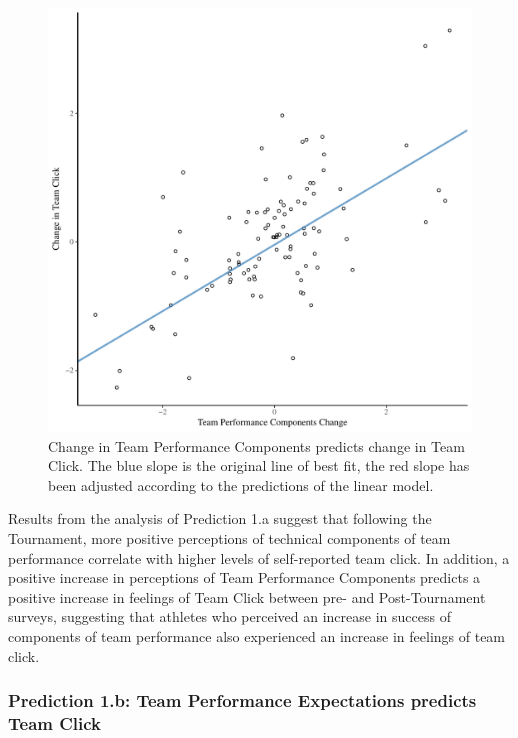 \begin{CJK}{UTF8}{gbsn}


\begin{figure}[htbp]
  \centering
\includegraphics[scale=.5]{images/jasClickDeltaModelSlope}
  \caption{Change in Team Performance Components predicts change in Team Click. The blue slope is the original line of best fit, the red slope has been adjusted according to the predictions of the linear model.}
  \label{fig:jasClickDeltaModelSLope}
\end{figure}

Results from the analysis of Prediction 1.a suggest that following the Tournament, more positive perceptions of technical components of team performance correlate with higher levels of self-reported team click.  In addition, a positive increase in perceptions of Team Performance Components predicts a positive increase in feelings of Team Click between pre- and Post-Tournament surveys, suggesting that athletes who perceived an increase in success of components of team performance also experienced an increase in feelings of team click.






\subsubsection{Prediction 1.b: Team Performance Expectations predicts Team Click}


\end{CJK}

